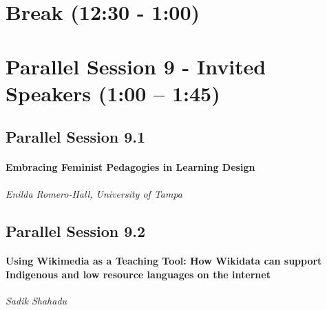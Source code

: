 \documentclass[
]{book}
\begin{document}
\hypertarget{break-1230---100-2}{%
\section*{Break (12:30 - 1:00)}\label{break-1230---100-2}}

\hypertarget{parallel-session-9---invited-speakers-100-145}{%
\section*{Parallel Session 9 - Invited Speakers (1:00 -- 1:45)}\label{parallel-session-9---invited-speakers-100-145}}

\hypertarget{parallel-session-9.1}{%
\subsection*{Parallel Session 9.1}\label{parallel-session-9.1}}

\begin{wp}
\hypertarget{embracing-feminist-pedagogies-in-learning-design}{%
\paragraph{Embracing Feminist Pedagogies in Learning
Design}\label{embracing-feminist-pedagogies-in-learning-design}}

\emph{Enilda Romero-Hall, University of Tampa}
\end{wp}

\hypertarget{parallel-session-9.2}{%
\subsection*{Parallel Session 9.2}\label{parallel-session-9.2}}

\begin{wp}
\hypertarget{using-wikimedia-as-a-teaching-tool-how-wikidata-can-support-indigenous-and-low-resource-languages-on-the-internet}{%
\paragraph{Using Wikimedia as a Teaching Tool: How Wikidata can support
Indigenous and low resource languages on the
internet}\label{using-wikimedia-as-a-teaching-tool-how-wikidata-can-support-indigenous-and-low-resource-languages-on-the-internet}}

\emph{Sadik Shahadu}
\end{wp}
\end{document}
